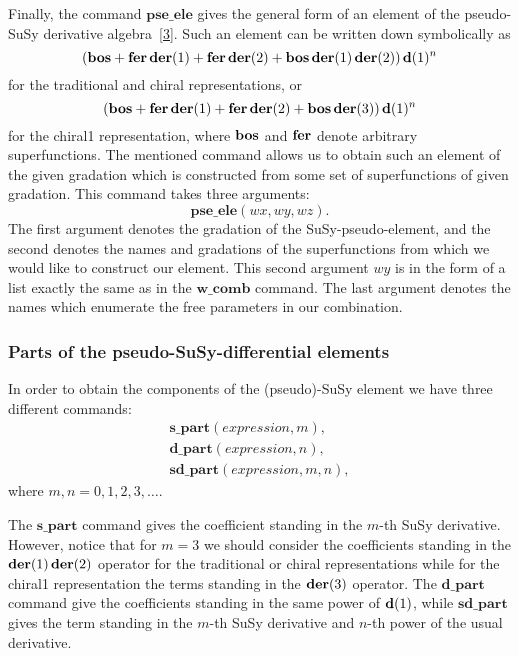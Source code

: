 {Finally, the command $\mathbf{pse\_ele}$ gives the general form of an
element of the pseudo-SuSy derivative
algebra~\hyperref[susy2-bib]{[3]}.  Such an element can be written
down symbolically as
\begin{equation*}
  (\mathbf{bos} + \mathbf{fer}\,\mathbf{der}(1)+\mathbf{fer}\,\mathbf{der}(2)+\mathbf{bos}\,\mathbf{der}(1)\,\mathbf{der}(2))\,\mathbf{d}(1)^n
\end{equation*}
for the traditional and chiral representations, or
\begin{equation*}
  (\mathbf{bos} + \mathbf{fer}\,\mathbf{der}(1)+\mathbf{fer}\,\mathbf{der}(2)+\mathbf{bos}\,\mathbf{der}(3))\,\mathbf{d}(1)^n
\end{equation*}
for the chiral1 representation, where $\mathbf{bos}$ and $\mathbf{fer}$ denote
arbitrary superfunctions.  The mentioned command allows us to obtain
such an element of the given gradation which is constructed from some set
of superfunctions of given gradation.  This command takes three
arguments:
\begin{equation*}
  \mathbf{pse\_ele}(\mathit{wx},\mathit{wy},\mathit{wz}).
\end{equation*}
The first argument denotes the gradation of the SuSy-pseudo-element,
and the second denotes the names and gradations of the superfunctions
from which we would like to construct our element.  This second
argument $wy$ is in the form of a list exactly the same as in the
$\mathbf{w\_comb}$ command.  The last argument denotes the names which
enumerate the free parameters in our combination.

\subsubsection*{Parts of the pseudo-SuSy-differential elements}

In order to obtain the components of the (pseudo)-SuSy element we have
three different commands:
\begin{gather*}
  \mathbf{s\_part}(\mathit{expression},m), \\
  \mathbf{d\_part}(\mathit{expression},n), \\
  \mathbf{sd\_part}(\mathit{expression},m,n),
\end{gather*}
where $m,n=0,1,2,3,\ldots$.

The $\mathbf{s\_part}$ command gives the coefficient standing in the
$m$-th SuSy derivative.  However, notice that for $m=3$ we should
consider the coefficients standing in the $\mathbf{der}(1)\,\mathbf{der}(2)$ operator
for the traditional or chiral representations while for the chiral1
representation the terms standing in the $\mathbf{der}(3)$ operator.  The
$\mathbf{d\_part}$ command give the coefficients standing in the same
power of $\mathbf{d}(1)$, while $\mathbf{sd\_part}$ gives the term standing in
the $m$-th SuSy derivative and $n$-th power of the usual derivative.

}
